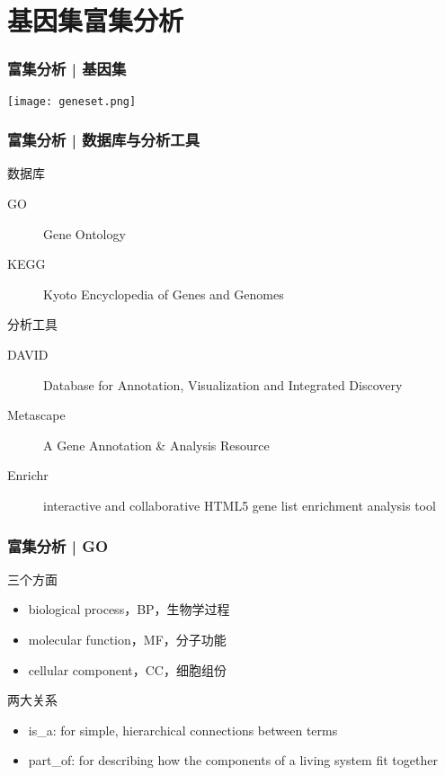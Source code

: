 \section{基因集富集分析}
\begin{frame}
  \frametitle{富集分析 | 基因集}
    \begin{center}
      \texttt{[image: geneset.png]}
    \end{center}
\end{frame}

\begin{frame}
  \frametitle{富集分析 | 数据库与分析工具}
  \begin{block}{数据库}
  \begin{description}
    \item[GO] Gene Ontology
    \item[KEGG] Kyoto Encyclopedia of Genes and Genomes
  \end{description}
  \end{block}
  \pause
  \begin{block}{分析工具}
  \begin{description}
    \item[DAVID] Database for Annotation, Visualization and Integrated Discovery
    \item[Metascape] A Gene Annotation \& Analysis Resource
    \item[Enrichr] interactive and collaborative HTML5 gene list enrichment analysis tool
  \end{description}
  \end{block}
\end{frame}

\begin{frame}
  \frametitle{富集分析 | \alert{GO}}
  \begin{block}{三个方面}
    \begin{itemize}
      \item biological process，BP，生物学过程
      \item molecular function，MF，分子功能
      \item cellular component，CC，细胞组份
    \end{itemize}
  \end{block}
  \pause
  \begin{block}{两大关系}
    \begin{itemize}
      \item is\_a: for simple, hierarchical connections between terms
      \item part\_of: for describing how the components of a living system fit together
    \end{itemize}
  \end{block}
\end{frame}

